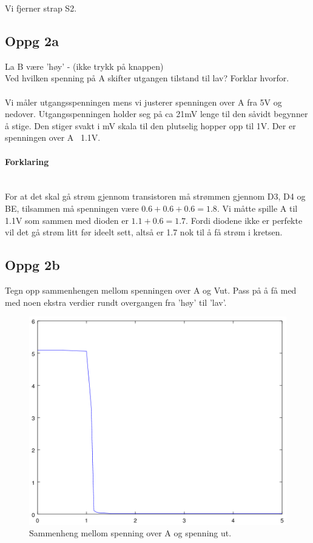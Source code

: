 Vi fjerner strap S2.

\subsection{Oppg 2a}
La B være ’høy’ - (ikke trykk på knappen) \\
Ved hvilken spenning på A skifter utgangen tilstand til lav? Forklar hvorfor.
\\\\
Vi måler utgangsspenningen mens vi justerer spenningen over A fra 5V og nedover.
Utgangsspenningen holder seg på ca 21mV lenge til den såvidt begynner å stige.
Den stiger svakt i mV skala til den plutselig hopper opp til 1V.
Der er spenningen over A ~1.1V.

\paragraph{Forklaring} \mbox{} \\
For at det skal gå strøm gjennom transistoren må strømmen gjennom D3, D4 og BE,
tilsammen må spenningen være $0.6 + 0.6 + 0.6 = 1.8$.
Vi måtte spille A til 1.1V som sammen med dioden er $1.1 + 0.6 = 1.7$.
Fordi diodene ikke er perfekte vil det gå strøm litt før ideelt sett,
altså er 1.7 nok til å få strøm i kretsen.



\subsection{Oppg 2b}
Tegn opp sammenhengen mellom spenningen over A og 
Vut.  
Pass på å få med med noen ekstra verdier rundt overgangen 
fra ’høy’ til ’lav’.
\begin{figure}[!ht]
  \caption{Sammenheng mellom spenning over A og spenning ut.}
  \centering
    \includegraphics[width=\textwidth]{2a}
\end{figure}

